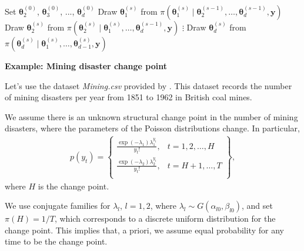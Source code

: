 \begin{algorithm}[h!]
	\caption{Gibbs sampling}\label{Alg:Gibbs}
	\begin{algorithmic}[1]  		 			
		\State Set $\bm{\theta}_2^{(0)}$, $\bm{\theta}_3^{(0)}$, ..., $\bm{\theta}_d^{(0)}$
		\State Draw $\bm{\theta}_1^{(s)}$ from $\pi(\bm{\theta}_1^{(s)}\mid \bm{\theta}_2^{(s-1)},\dots,\bm{\theta}_d^{(s-1)},\bm{y})$
		\State Draw $\bm{\theta}_2^{(s)}$ from $\pi(\bm{\theta}_2^{(s)}\mid \bm{\theta}_1^{(s)},\dots,\bm{\theta}_d^{(s-1)},\bm{y})$
		\State $\vdots$
		\State Draw $\bm{\theta}_d^{(s)}$ from $\pi(\bm{\theta}_d^{(s)}\mid \bm{\theta}_1^{(s)},\dots,\bm{\theta}_{d-1}^{(s)},\bm{y})$ 
		\EndFor 
		\end{algorithmic} 
\end{algorithm}

\textbf{Example: Mining disaster change point}

Let's use the dataset \textit{Mining.csv} provided by \cite{carlin1992hierarchical}. This dataset records the number of mining disasters per year from 1851 to 1962 in British coal mines.

We assume there is an unknown structural change point in the number of mining disasters, where the parameters of the Poisson distributions change. In particular,
\begin{align*}
	p(y_t)=\begin{Bmatrix}
		\frac{\exp(-\lambda_1)\lambda_1^{y_t}}{y_t!}, & t=1,2,\dots,H\\
		\frac{\exp(-\lambda_2)\lambda_2^{y_t}}{y_t!}, & t=H+1,\dots,T\\
	\end{Bmatrix},
\end{align*}  
where $H$ is the change point.

We use conjugate families for $\lambda_l$, $l = 1, 2$, where $\lambda_l \sim G(\alpha_{l0}, \beta_{l0})$, and set $\pi(H) = 1 / T$, which corresponds to a discrete uniform distribution for the change point. This implies that, a priori, we assume equal probability for any time to be the change point.

